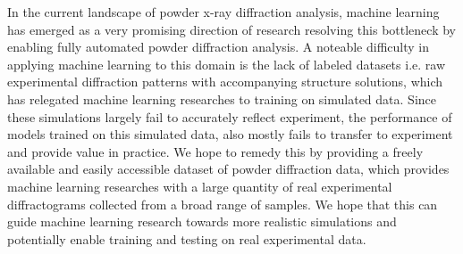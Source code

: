 In the current landscape of powder x-ray diffraction analysis, machine learning has emerged as a very promising direction of research resolving this bottleneck by enabling fully automated powder diffraction analysis.
A noteable difficulty in applying machine learning to this domain is the lack of labeled datasets i.e. raw experimental diffraction patterns with accompanying structure solutions, which has relegated machine learning researches to training on simulated data. Since these simulations largely fail to accurately reflect experiment, the performance of models trained on this simulated data, also mostly fails to transfer to experiment and provide value in practice. 
We hope to remedy this by providing a freely available and easily accessible dataset of powder diffraction data, which provides machine learning researches with a large quantity of real experimental diffractograms collected from a broad range of samples. We hope that this can guide machine learning research towards more realistic simulations and potentially enable training and testing on real experimental data.



